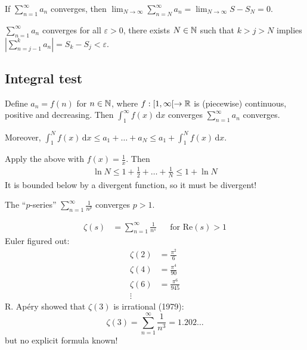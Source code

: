 \documentclass[12pt]{article}
\begin{document}
\begin{theorem}
    If $\sum_{n=1}^{\infty}a_n$ converges, then $\lim_{N\to \infty}\sum_{n=N}^{\infty}a_n=\lim_{N\to \infty}S-S_N=0$.
\end{theorem}

\begin{theorem}
    $\sum_{n=1}^{\infty}a_n$ converges \ifnif for all $\varepsilon>0$, there exists $N\in \mathbb{N}$ such that $k>j>N$ implies $\displaystyle \left|\sum_{n=j-1}^{k}a_n \right|=S_k-S_j<\varepsilon$.
\end{theorem}

\subsection{Integral test}

 Define $a_n=f(n)$ for $n\in \mathbb{N}$, where $f:[1,\infty[ \to \mathbb{R}$ is (piecewise) continuous, positive and decreasing. Then $\int_{1}^{\infty}f(x)\, \mathrm{d}x$ converges \ifnif $\sum_{n=1}^{\infty}a_n$ converges.

Moreover, $\int_{1}^{N}f(x)\,\mathrm{d}x\leq a_1+\dots+a_N\leq a_1+\int_{1}^{N}f(x)\,\mathrm{d}x$.

\eg Apply the above with $f(x)=\frac{1}{x}$. Then \begin{align*}
    \ln N\leq 1+\frac{1}{2}+\dots+\frac{1}{N}\leq 1+\ln N
\end{align*}
It is bounded below by a divergent function, so it must be divergent!

\begin{theorem}
    The ``$p$-series'' $\sum_{n=1}^{\infty}\frac{1}{n^p}$ converges \ifnif $p>1$.
\end{theorem}

 \begin{align*}
    \zeta(s)&=\sum_{n=1}^{\infty}\frac{1}{n^s} && \text{for Re}(s)>1
\end{align*}
\rmk Euler figured out: \begin{align*}
    \zeta(2)&=\frac{\pi^2}{6}\\
    \zeta(4)&=\frac{\pi^4}{90}\\
    \zeta(6)&=\frac{\pi^6}{945}\\
    \vdots
\end{align*}
\rmk R. Apéry showed that $\zeta(3)$ is irrational (1979):
\[\zeta(3)=\sum_{n=1}^{\infty}\frac{1}{n^3}=1.202\dots\]
but no explicit formula known!
\end{document}
